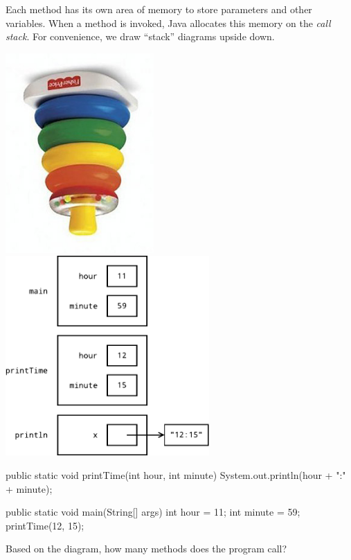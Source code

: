 
Each method has its own area of memory to store parameters and other variables.
When a method is invoked, Java allocates this memory on the \emph{call stack}.
For convenience, we draw ``stack'' diagrams upside down.

\begin{center}
\includegraphics[height=3in]{stack-rings1.png}
\hspace{1em}
\includegraphics[height=3in]{stack1.pdf}
\end{center}

\begin{javalst}
    public static void printTime(int hour, int minute) {
        System.out.println(hour + ":" + minute);
    }
    
    public static void main(String[] args) {
        int hour = 11;
        int minute = 59;
        printTime(12, 15);
    }
\end{javalst}




\Q Based on the diagram, how many methods does the program call? 
\vspace{1em}


